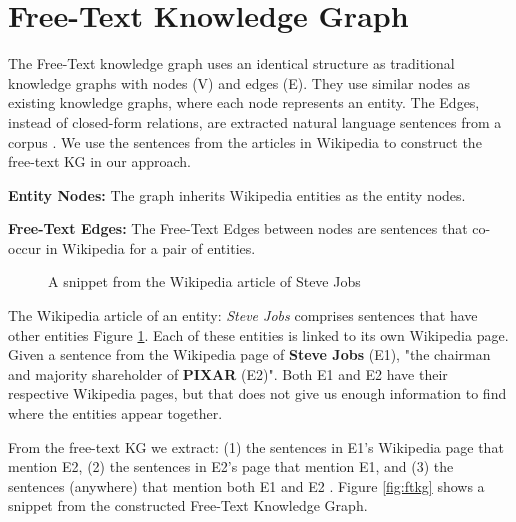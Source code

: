 \begin{sloppypar}
\section{Free-Text Knowledge Graph}
The Free-Text knowledge graph uses an identical structure as traditional knowledge graphs with nodes (V) and edges (E). They use similar nodes as existing knowledge graphs, where each node represents an entity. The Edges, instead of closed-form relations, are extracted natural language sentences from a corpus \cite{delft}. We use the sentences from the articles in Wikipedia to construct the free-text KG in our approach.

\textbf{Entity Nodes:} The graph inherits Wikipedia entities as the entity nodes.

\textbf{Free-Text Edges:} The Free-Text Edges between nodes are sentences that co-occur in Wikipedia for a pair of entities.

\begin{figure}
\centering
  \begin{minipage}[b]{0.7\textwidth}
      \caption{A snippet from the Wikipedia article of Steve Jobs}
    \label{fig:wikisj}
  \end{minipage}
  \end{figure}
The Wikipedia article of an entity: \textit{Steve Jobs} comprises sentences that have other entities Figure \ref{fig:wikisj}. Each of these entities is linked to its own Wikipedia page. Given a sentence from the Wikipedia page of \textbf{Steve Jobs} (E1), {\selectfont "the chairman and majority shareholder of \textbf{PIXAR}} (E2)". Both E1 and E2 have their respective Wikipedia pages, but that does not give us enough information to find where the entities appear together.

From the free-text KG we extract: (1) the sentences in E1’s Wikipedia page that mention E2, (2) the sentences in E2’s page that mention E1, and (3) the sentences (anywhere) that mention both E1 and E2 \cite{delft}. Figure \ref{fig:ftkg} shows a snippet from the constructed Free-Text Knowledge Graph.


\end{sloppypar}

